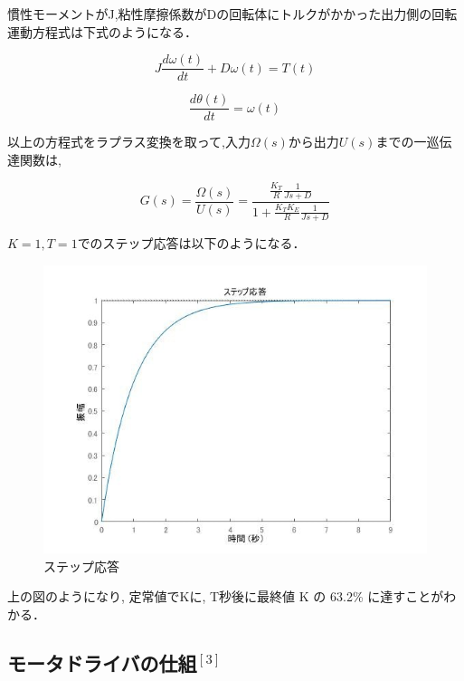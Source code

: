 \documentclass[xelatex,ja=standard,jafont=noto]{bxjsarticle}
\begin{document}
	慣性モーメントがJ,粘性摩擦係数がDの回転体にトルクがかかった出力側の回転運動方程式は下式のようになる．
	
	\begin{equation}
	J\frac{d\omega(t)}{dt}+D\omega(t)=T(t)
	\end{equation}
	
	
	\begin{equation}
	\frac{d\theta(t)}{dt}=\omega(t)
	\end{equation}


以上の方程式をラプラス変換を取って,入力$ \Omega(s)　$から出力$ U(s)　$までの一巡伝達関数は, 

\begin{equation}
	G(s)=\frac{\Omega(s)}{U(s)}=\frac{\frac{K_{T}}{R}\frac{1}{Js+D}}{1+\frac{K_{T}K_{E}}{R}\frac{1}{Js+D}}
	\end{equation}
	
	
	$ K=1,T=1　$でのステップ応答は以下のようになる．
	
	\newpage
	
	\begin{figure}[h!]
    \centering
    \includegraphics[scale=0.35]{015.jpeg}
    \caption{ステップ応答 }
\end{figure}

上の図のようになり, 定常値でKに, T秒後に最終値 K の 63.2\% に達すことがわかる．\\


\subsection{モータドライバの仕組$ ^{[3]}　$}
\end{document}
